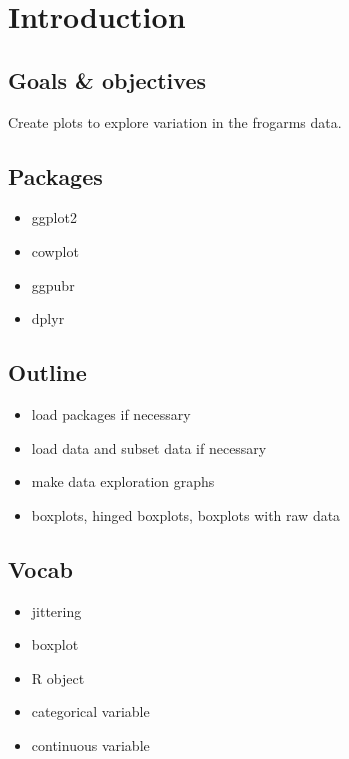 \documentclass[]{book}
\providecommand{\tightlist}{%
  \setlength{\itemsep}{0pt}\setlength{\parskip}{0pt}}
\theoremstyle{definition}
\theoremstyle{definition}
\theoremstyle{definition}
\theoremstyle{remark}
\begin{document}
\section{Introduction}\label{introduction-9}

\subsection{Goals \& objectives}\label{goals-objectives}

Create plots to explore variation in the frogarms data.

\subsection{Packages}\label{packages-8}

\begin{itemize}
\tightlist
\item
  ggplot2
\item
  cowplot
\item
  ggpubr
\item
  dplyr
\end{itemize}

\subsection{Outline}\label{outline-3}

\begin{itemize}
\tightlist
\item
  load packages if necessary
\item
  load data and subset data if necessary
\item
  make data exploration graphs
\item
  boxplots, hinged boxplots, boxplots with raw data
\end{itemize}

\subsection{Vocab}\label{vocab}

\begin{itemize}
\tightlist
\item
  jittering
\item
  boxplot
\item
  R object
\item
  categorical variable
\item
  continuous variable
\end{itemize}
\end{document}
